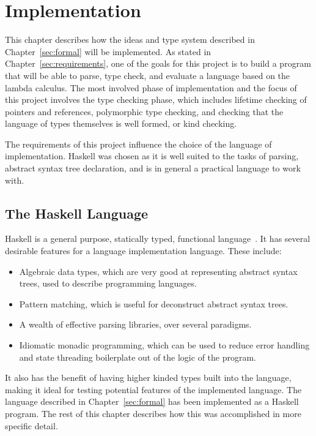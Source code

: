 \chapter{Implementation}\label{sec:impl}
This chapter describes how the ideas and type system described in
Chapter~\ref{sec:formal} will be implemented. As stated in
Chapter~\ref{sec:requirements}, one of the goals for this project is to build a
program that will be able to parse, type check, and evaluate a language based
on the lambda calculus. The most involved phase of implementation and the focus
of this project involves the type checking phase, which includes lifetime
checking of pointers and references, polymorphic type checking, and checking
that the language of types themselves is well formed, or kind checking.

The requirements of this project influence the choice of the language of
implementation. Haskell was chosen as it is well suited to the tasks of
parsing, abstract syntax tree declaration, and is in general a practical
language to work with.

\section{The Haskell Language}
Haskell is a general purpose, statically typed, functional
language~\cite{haskell}. It has several desirable features for a language
implementation language. These include:

\begin{itemize}
    \item Algebraic data types, which are very good at representing abstract syntax
    trees, used to describe programming languages.
    \item Pattern matching, which is useful for deconstruct abstract syntax trees.
    \item A wealth of effective parsing libraries, over several paradigms.
    \item Idiomatic monadic programming, which can be used to reduce error handling
    and state threading boilerplate out of the logic of the program.
\end{itemize}

It also has the benefit of having higher kinded types built into the language,
making it ideal for testing potential features of the implemented language.
The language described in Chapter~\ref{sec:formal} has been implemented as a
Haskell program. The rest of this chapter describes how this was accomplished
in more specific detail.

